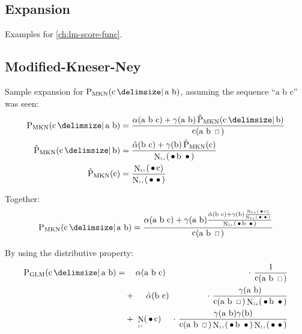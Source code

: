 \documentclass[11pt,a4paper]{report}
\newcommand*{\Scale}[2][4]{\scalebox{#1}{$#2$}}%
\DeclareMathOperator{\Count}{c}
\DeclareMathOperator{\ContCount}{N}
\newcommand{\ContCountIp}  {\ContCount_{\Scale[0.5]{1+}}}
\newcommand{\Skp}{\ensuremath{\,\Scale[0.7]{\square}\,}}
\newcommand{\WSkp}{\ensuremath{\,\bullet\,}}
\begin{document}
{\begin{appendices}
\chapter{Expansion}
\label{app:expansion}

Examples for \cref{ch:lm-score-func}.

\section{Modified-Kneser-Ney}

\newcommand{\ProbMKNcab}[1]
  {\frac{\alpha(\text{a b c}) + \gamma(\text{a b}) #1}{\Count(\text{a b \Skp})}}
\newcommand{\ProbMKNcb}[1]
  {\frac{\hat\alpha(\text{b c}) + \gamma(\text{b}) #1}{\ContCountIp(\text{\WSkp b \WSkp})}}
\newcommand{\ProbMKNc}
  {\frac{\ContCountIp(\text{\WSkp c})}{\ContCountIp(\text{\WSkp \WSkp})}}

Sample expansion for $\ProbMKN{\text{c}}{\text{a b}}$, assuming the sequence
``$\text{a b c}$'' was seen:
\begin{align}
  \ProbMKN {\text{c}}{\text{a b}} &= \ProbMKNcab{\ProbMKN*{\text{c}}{\text{b}}} \\
  \ProbMKN*{\text{c}}{\text{b}}   &= \ProbMKNcb{\ProbMKN*{\text{c}}} \\
  \ProbMKN*{\text{c}}             &= \ProbMKNc
\end{align}

Together:
\begin{equation}
  \ProbMKN {\text{c}}{\text{a b}} = \ProbMKNcab{\ProbMKNcb{\ProbMKNc}}
\end{equation}

By using the distributive property:
\begin{eqnarray}
  \ProbGLM {\text{c}}{\text{a b}} =
    &\phantom{+} \; \hspace{0.2em}   \alpha(\text{a b c}) & \hspace{-0.5em} \cdot\ \frac{1}{\Count(\text{a b \Skp})} \\
    &         +  \; \hspace{1em} \hat\alpha(\text{b c})   & \hspace{-0.5em} \cdot\ \frac{\gamma(\text{a b})}{\Count(\text{a b \Skp}) \ContCountIp(\text{\WSkp b \WSkp})} \nonumber \\
    &         +  \; \ContCountIp(\text{\WSkp c})          & \hspace{-0.5em} \cdot\ \frac{\gamma(\text{a b}) \gamma(\text{b})}{\Count(\text{a b \Skp}) \ContCountIp(\text{\WSkp b \WSkp}) \ContCountIp(\text{\WSkp \WSkp})} \nonumber
\end{eqnarray}



\end{appendices}}
\end{document}
